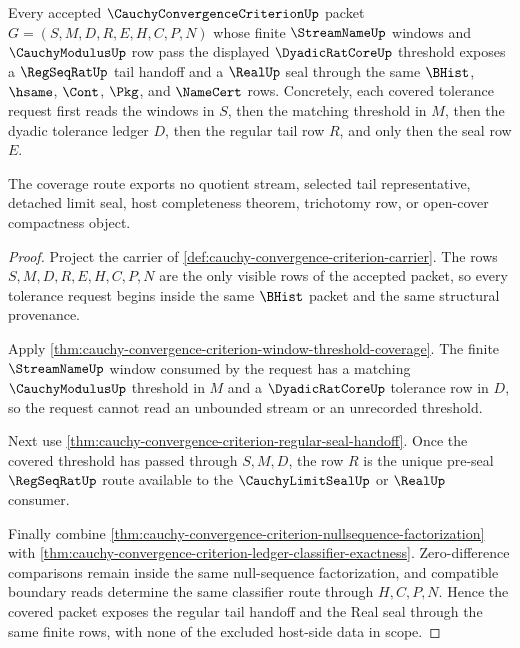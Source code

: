 \begin{theorem}
\label{thm:cauchy-convergence-criterion-regular-tail-coverage}
Every accepted $\CauchyConvergenceCriterionUp$ packet $G=(S,M,D,R,E,H,C,P,N)$ whose finite $\StreamNameUp$ windows and $\CauchyModulusUp$ row pass the displayed $\DyadicRatCoreUp$ threshold exposes a $\RegSeqRatUp$ tail handoff and a $\RealUp$ seal through the same $\BHist$, $\hsame$, $\Cont$, $\Pkg$, and $\NameCert$ rows. Concretely, each covered tolerance request first reads the windows in $S$, then the matching threshold in $M$, then the dyadic tolerance ledger $D$, then the regular tail row $R$, and only then the seal row $E$.

The coverage route exports no quotient stream, selected tail representative, detached limit seal, host completeness theorem, trichotomy row, or open-cover compactness object.
\end{theorem}
\begin{proof}
Project the carrier of \autoref{def:cauchy-convergence-criterion-carrier}. The rows $S,M,D,R,E,H,C,P,N$ are the only visible rows of the accepted packet, so every tolerance request begins inside the same $\BHist$ packet and the same structural provenance.

Apply \autoref{thm:cauchy-convergence-criterion-window-threshold-coverage}. The finite $\StreamNameUp$ window consumed by the request has a matching $\CauchyModulusUp$ threshold in $M$ and a $\DyadicRatCoreUp$ tolerance row in $D$, so the request cannot read an unbounded stream or an unrecorded threshold.

Next use \autoref{thm:cauchy-convergence-criterion-regular-seal-handoff}. Once the covered threshold has passed through $S,M,D$, the row $R$ is the unique pre-seal $\RegSeqRatUp$ route available to the $\CauchyLimitSealUp$ or $\RealUp$ consumer.

Finally combine \autoref{thm:cauchy-convergence-criterion-nullsequence-factorization} with \autoref{thm:cauchy-convergence-criterion-ledger-classifier-exactness}. Zero-difference comparisons remain inside the same null-sequence factorization, and compatible boundary reads determine the same classifier route through $H,C,P,N$. Hence the covered packet exposes the regular tail handoff and the Real seal through the same finite rows, with none of the excluded host-side data in scope.
\end{proof}

